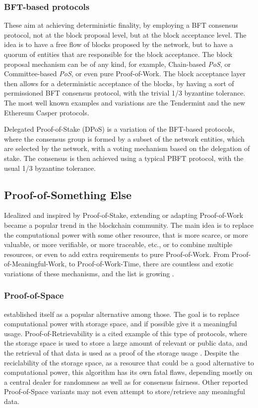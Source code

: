 \documentclass[journal]{IEEEtran}
\begin{document}
\subsubsection{BFT-based protocols}

These aim at achieving deterministic finality, by employing a BFT
consensus protocol, not at the block proposal level, but at the
block acceptance level. The idea is to have a free flow of blocks
proposed by the network, but to have a quorum of entities that
are responsible for the block acceptance. The block proposal mechanism
can be of any kind, for example, Chain-based \emph{PoS}, or Committee-based \emph{PoS},
or even pure Proof-of-Work. The block acceptance layer then allows
for a deterministic acceptance of the blocks, by having a sort of permissioned
BFT consensus protocol, with the trivial 1/3 byzantine tolerance. The most well known examples
and variations are the Tendermint \cite{buchman2016tendermint} and the new Ethereum Casper 
\cite{buterin2017casper} protocols.

Delegated Proof-of-Stake (DPoS) is a variation of the BFT-based protocols,
where the consensus group is formed by a subset of the network entities,
which are selected by the network, with a voting mechanism based on the
delegation of stake. The consensus is then achieved using a typical 
PBFT protocol, with the usual 1/3 byzantine tolerance.

\subsection{Proof-of-Something Else}

Idealized and inspired by Proof-of-Stake, extending or adapting Proof-of-Work
became a popular trend in the blockchain community. The main idea is to
replace the computational power with some other resource, that is
more scarce, or more valuable, or more verifiable, or more traceable, etc.,
or to combine multiple resources, or even to add extra requirements to 
pure Proof-of-Work. From Proof-of-Meaningful-Work, to Proof-of-Work-Time, there
are countless and exotic variations of these mechanisms, and the list is growing \cite{token-economy-gitbook}.

\subsubsection{Proof-of-Space} established itself as a popular alternative among those.
The goal is to replace computational power with storage space,
and if possible give it a meaningful usage. Proof-of-Retrievability is
a cited example of this type of protocols, where the storage space is
used to store a large amount of relevant or public data, and the retrieval of that data
is used as a proof of the storage usage \cite{juels2007pors}. Despite the reciclability 
of the storage space, as a resource that could be a good alternative
to computational power, this algorithm has its own fatal flaws, depending
mostly on a central dealer for randomness as well as for consensus fairness.
Other reported Proof-of-Space variants may not even attempt to store/retrieve any meaningful data.
\end{document}
